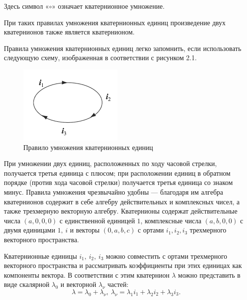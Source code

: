 \documentclass[14pt]{extreport}
\begin{document}
Здесь символ «$\circ$» означает кватернионное умножение.

При таких правилах умножения кватернионных единиц произведение двух кватернионов также является кватернионом.

Правила умножения кватернионных единиц легко запомнить, если использовать следующую схему, изображенная в соответствии с рисунком 2.1.
\begin{figure}[h]
\center \includegraphics[scale=1]{fig/img21.png}
\caption{Правило умножения кватернионных единиц}
\end{figure}

При умножении двух единиц, расположенных по ходу часовой стрелки, получается третья единица с плюсом; при расположении единиц в обратном порядке (против хода часовой стрелки) получается третья единица со знаком минус. Правила умножения чрезвычайно удобны — благодаря им алгебра кватернионов содержит в себе алгебру действительных и комплексных чисел, а также трехмерную векторную алгебру. Кватернионы содержат действительные числа $(a,0,0,0)$ с единственной единицей $1$, комплексные числа $(a,b,0,0)$ с двумя единицами $1,\ i$ и векторы $(0, a, b, c)$ с ортами $i_{1},i_{2},i_{3}$ трехмерного векторного пространства.

Кватернионные единицы $i_{1},\ i_{2},\ i_{3}$ можно совместить с ортами трехмерного векторного пространства и рассматривать коэффициенты при этих единицах как компоненты вектора. В соответствии с этим кватернион $\lambda$ можно представить в виде скалярной $\lambda_{0}$ и векторной $\lambda_{\nu}$ частей:
\begin{equation}
\label{quat-sum-scal-vect}
\lambda=\lambda_{0}+\lambda_{\nu},\ \lambda_{\nu}=\lambda_{1}i_{1}+\lambda_{2}i_{2}+\lambda_{3}i_{3}.
\end{equation}
\end{document}
